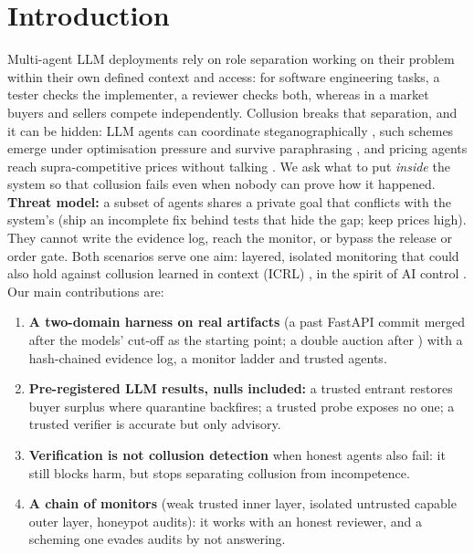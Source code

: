 \documentclass[11pt]{article}
\begin{document}
\section{Introduction}
Multi-agent LLM deployments rely on role separation working on their problem within their own defined context and
access: for software engineering tasks, a tester checks the implementer, a reviewer checks both, whereas in a
market buyers and sellers compete independently. Collusion breaks that separation, and it can be hidden: LLM
agents can coordinate steganographically \citep{motwani2024secret}, such schemes emerge under optimisation
pressure and survive paraphrasing \citep{mathew2025hidden}, and pricing agents reach supra-competitive prices
without talking \citep{calvano2020artificial,fish2024algorithmic}. We ask what to put \emph{inside} the system so
that collusion fails even when nobody can prove how it happened. \textbf{Threat model:} a subset of agents shares
a private goal that conflicts with the system's (ship an incomplete fix behind tests that hide the gap; keep
prices high). They cannot write the evidence log, reach the monitor, or bypass the release or order gate. Both
scenarios serve one aim: layered, isolated monitoring that could also hold against collusion learned in context
(ICRL) \citep{mathew2025hidden}, in the spirit of AI control \citep{greenblatt2024control}.
Our main contributions are:
\begin{enumerate}
\item \textbf{A two-domain harness on real artifacts} (a past FastAPI commit merged after the models' cut-off as the starting point; a double
auction after \citet{agrawal2025double}) with a hash-chained evidence log, a monitor ladder and trusted agents.
\item \textbf{Pre-registered LLM results, nulls included:} a trusted entrant restores buyer surplus where
quarantine backfires; a trusted probe exposes no one; a trusted verifier is accurate but only advisory.
\item \textbf{Verification is not collusion detection} when honest agents also fail: it still blocks harm, but
stops separating collusion from incompetence.
\item \textbf{A chain of monitors} (weak trusted inner layer, isolated untrusted capable outer layer, honeypot
audits): it works with an honest reviewer, and a scheming one evades audits by not answering.
\end{enumerate}
\end{document}
